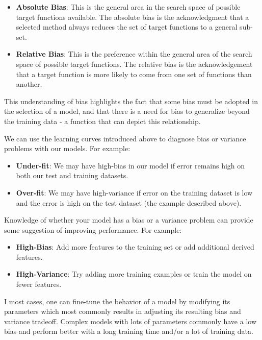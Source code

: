 \begin{itemize}
	\item \textbf{Absolute Bias}: This is the general area in the search space of possible target functions available. The absolute bias is the acknowledgment that a selected method always reduces the set of target functions to a general sub-set.
	\item \textbf{Relative Bias}: This is the preference within the general area of the search space of possible target functions. The relative bias is the acknowledgement that a target function is more likely to come from one set of functions than another.
\end{itemize} 

This understanding of bias highlights the fact that some bias must be adopted in the selection of a model, and that there is a need for bias to generalize beyond the training data - a function that can depict this relationship.

We can use the learning curves introduced above to diagnose bias or variance problems with our models. For example:

\begin{itemize}
	\item \textbf{Under-fit}: We may have high-bias in our model if error remains high on both our test and training datasets.
	\item \textbf{Over-fit}: We may have high-variance if error on the training dataset is low and the error is high on the test dataset (the example described above).
\end{itemize}

Knowledge of whether your model has a bias or a variance problem can provide some suggestion of improving performance. For example:

\begin{itemize}
	\item \textbf{High-Bias}: Add more features to the training set or add additional derived features.
	\item \textbf{High-Variance}: Try adding more training examples or train the model on fewer features.
\end{itemize}

I most cases, one can fine-tune the behavior of a model by modifying its parameters which most commonly results in adjusting its resulting bias and variance tradeoff. Complex models with lots of parameters commonly have a low bias and perform better with a long training time and/or a lot of training data.
